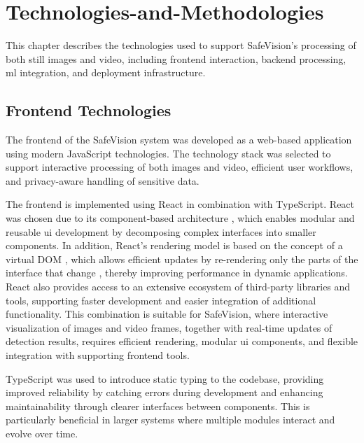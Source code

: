 \chapter{Technologies-and-Methodologies}
\label{chap:technologies_and_methodologies}

This chapter describes the technologies used to support \gls{SafeVision}'s processing of both still images and video, including frontend interaction, backend processing, \acrshort{ml} integration, and deployment infrastructure.

\section{Frontend Technologies}

The frontend of the \gls{SafeVision} system was developed as a web-based application using modern JavaScript technologies. The technology stack was selected to support interactive processing of both images and video, efficient user workflows, and privacy-aware handling of sensitive data.


The frontend is implemented using React in combination with TypeScript. React was chosen due to its component-based architecture \cite{react_components}, which enables modular and reusable \acrshort{ui} development by decomposing complex interfaces into smaller components. In addition, React’s rendering model is based on the concept of a virtual DOM \cite{react_virtual_dom}, which allows efficient updates by re-rendering only the parts of the interface that change \cite{virtual_dom_overview}, thereby improving performance in dynamic applications. React also provides access to an extensive ecosystem of third-party libraries and tools, supporting faster development and easier integration of additional functionality. This combination is suitable for \gls{SafeVision}, where interactive visualization of images and video frames, together with real-time updates of detection results, requires efficient rendering, modular \acrshort{ui} components, and flexible integration with supporting frontend tools.

TypeScript was used to introduce static typing to the codebase, providing improved reliability by catching errors during development \cite{typescript_benefits} and enhancing maintainability through clearer interfaces between components. This is particularly beneficial in larger systems where multiple modules interact and evolve over time.

